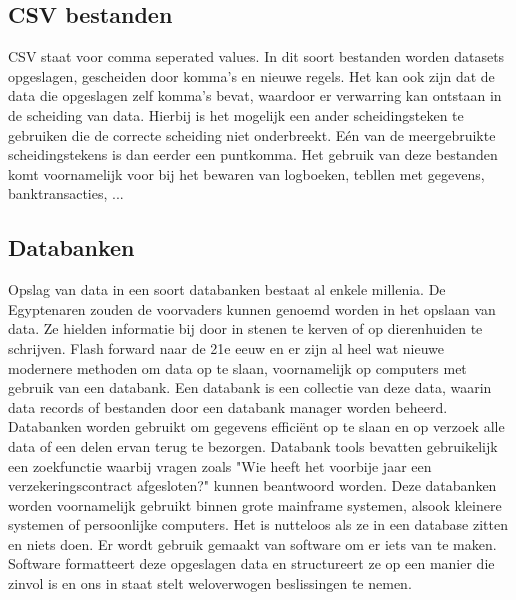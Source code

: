 \subsection{CSV bestanden}
CSV staat voor comma seperated values. In dit soort bestanden worden datasets opgeslagen, gescheiden door komma's en nieuwe regels.
Het kan ook zijn dat de data die opgeslagen zelf komma's bevat, waardoor er verwarring kan ontstaan in de scheiding van data. Hierbij is het mogelijk een ander scheidingsteken te gebruiken die de correcte scheiding niet onderbreekt. Eén van de meergebruikte scheidingstekens is dan eerder een puntkomma.
Het gebruik van deze bestanden komt voornamelijk voor bij het bewaren van logboeken, tebllen met gegevens, banktransacties, ...


\subsection{Databanken}
Opslag van data in een soort databanken bestaat al enkele millenia. De Egyptenaren zouden de voorvaders kunnen genoemd worden in het opslaan van data. Ze hielden informatie bij door in stenen te kerven of op dierenhuiden te schrijven. Flash forward naar de 21e eeuw en er zijn al heel wat nieuwe modernere methoden om data op te slaan, voornamelijk op computers met gebruik van een databank.
Een databank is een collectie van deze data, waarin data records of bestanden door een databank manager worden beheerd. \autocite{obenshain_2004} Databanken worden gebruikt om gegevens efficiënt op te slaan en op verzoek alle data of een delen ervan terug te bezorgen. Databank tools bevatten gebruikelijk een zoekfunctie waarbij vragen zoals "Wie heeft het voorbije jaar een verzekeringscontract afgesloten?" kunnen beantwoord worden. Deze databanken worden voornamelijk gebruikt binnen grote mainframe systemen, alsook kleinere systemen of persoonlijke computers. Het is nutteloos als ze in een database zitten en niets doen. Er wordt gebruik gemaakt van software om er iets van te maken. Software formatteert deze opgeslagen data en structureert ze op een manier die zinvol is en ons in staat stelt weloverwogen beslissingen te nemen.

